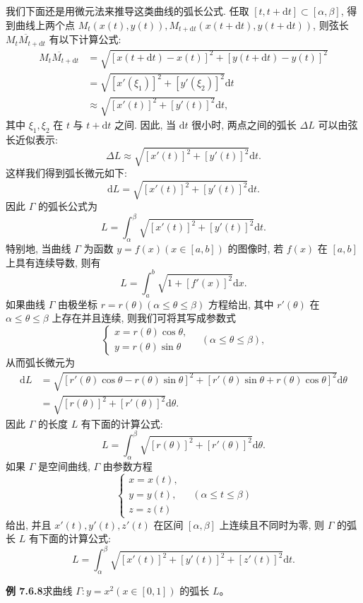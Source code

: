 \documentclass[UTF8,12pt,a4paper,fontset=fandol]{ctexart}
\begin{document}
我们下面还是用微元法来推导这类曲线的弧长公式. 任取 $[t,t+\mathrm dt]\subset[\alpha,\beta]$, 得到曲线上两个点 $M_t(x(t),y(t)),M_{t+\mathrm dt}(x(t+\mathrm dt),y(t+\mathrm dt))$, 则弦长 $\overline{M_tM_{t+\mathrm dt}}$ 有以下计算公式:
\[
\begin{aligned}
  \overline{M_tM_{t+\mathrm dt}}
  &=\sqrt{[x(t+\mathrm dt)-x(t)]^2+[y(t+\mathrm dt)-y(t)]^2}\\
  &=\sqrt{[x'(\xi_1)]^2+[y'(\xi_2)]^2}\mathrm dt\\
  &\approx\sqrt{[x'(t)]^2+[y'(t)]^2}\mathrm dt,
\end{aligned}
\]
其中 $\xi_1,\xi_2$ 在 $t$ 与 $t+\mathrm dt$ 之间. 因此, 当 $\mathrm dt$ 很小时, 两点之间的弧长 $\Delta L$ 可以由弦长近似表示:
\[
  \Delta L\approx\sqrt{[x'(t)]^2+[y'(t)]^2}\mathrm dt.
\]
这样我们得到弧长微元如下:
\[
  \mathrm dL=\sqrt{[x'(t)]^2+[y'(t)]^2}\mathrm dt.
\]
因此 $\Gamma$ 的弧长公式为
\[
  L=\int_\alpha^\beta\sqrt{[x'(t)]^2+[y'(t)]^2}\mathrm dt.
\]
特别地, 当曲线 $\Gamma$ 为函数 $y=f(x)(x\in[a,b])$ 的图像时, 若 $f(x)$ 在 $[a,b]$ 上具有连续导数, 则有
\[
  L=\int_a^b\sqrt{1+[f'(x)]^2}\mathrm dx.
\]
如果曲线 $\Gamma$ 由极坐标 $r=r(\theta)(\alpha\leq\theta\leq\beta)$ 方程给出, 其中 $r'(\theta)$ 在 $\alpha\leq\theta\leq\beta$ 上存在并且连续, 则我们可将其写成参数式
\[
  \begin{cases}
    x=r(\theta)\cos\theta,\\
    y=r(\theta)\sin\theta
  \end{cases}
  \quad(\alpha\leq\theta\leq\beta),
\]
从而弧长微元为
\[
\begin{aligned}
  \mathrm dL
  &=\sqrt{[r'(\theta)\cos\theta-r(\theta)\sin\theta]^2
  +[r'(\theta)\sin\theta+r(\theta)\cos\theta]^2}\mathrm d\theta\\
  &=\sqrt{[r(\theta)]^2+[r'(\theta)]^2}\mathrm d\theta.
\end{aligned}
\]
因此 $\Gamma$ 的长度 $L$ 有下面的计算公式:
\[
  L=\int_\alpha^\beta\sqrt{[r(\theta)]^2+[r'(\theta)]^2}\mathrm d\theta.
\]
如果 $\Gamma$ 是空间曲线, $\Gamma$ 由参数方程
\[
  \begin{cases}
    x=x(t),\\
    y=y(t),\\
    z=z(t)
  \end{cases}
  \quad(\alpha\leq t\leq\beta)
\]
给出, 并且 $x'(t),y'(t),z'(t)$ 在区间 $[\alpha,\beta]$ 上连续且不同时为零, 则 $\Gamma$ 的弧长 $L$ 有下面的计算公式:
\[
  L=\int_\alpha^\beta\sqrt{[x'(t)]^2+[y'(t)]^2+[z'(t)]^2}\mathrm dt.
\]

\noindent\textbf{例 7.6.8}\quad 求曲线 $\Gamma:y=x^2(x\in[0,1])$ 的弧长 $L$。
\end{document}
